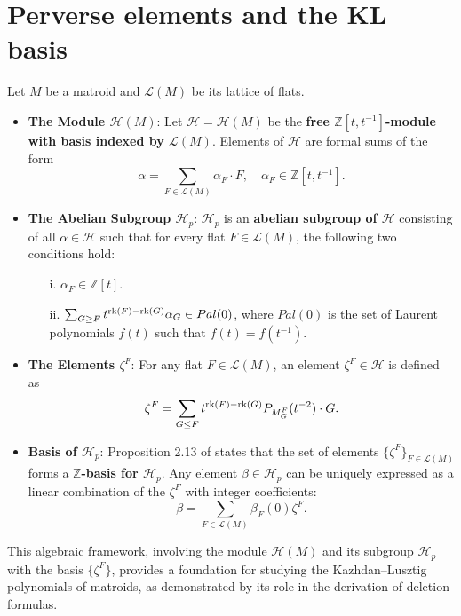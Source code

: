 \documentclass[10pt]{article}
\newcommand{\calL}{\mathcal{L}}
\newcommand{\calH}{\mathcal{H}}
\newcommand{\rank}{\normalfont\text{rk}}
\theoremstyle{remark}
\begin{document}
\section{Perverse elements and the KL basis}
\label{sec:algebraic_framework}

Let $M$ be a matroid and $\calL(M)$ be its lattice of flats.

\begin{itemize}
    \item \textbf{The Module $\calH(M)$}: Let $\calH = \calH(M)$ be the
    \textbf{free $\mathbb{Z}[t, t^{-1}]$-module with basis indexed by $\calL(M)$}.
    Elements of $\calH$ are formal sums of the form
    \[
    \alpha = \sum_{F \in \calL(M)} \alpha_F \cdot F, \quad \alpha_F \in \mathbb{Z}
    [t, t^{-1}].
    \]

    \item \textbf{The Abelian Subgroup $\calH_p$}: $\calH_p$ is an
    \textbf{abelian subgroup of $\calH$} consisting of all $\alpha \in \calH$
    such that for every flat $F \in \calL(M)$, the following two conditions hold:
    \begin{itemize}
        \item[i.] $\alpha_F \in \mathbb{Z}[t]$.
        \item[ii.] $\sum_{G \geq F} t^{\rank(F) - \rank(G)} \alpha_G \in Pal(0)$, where $Pal(0)$ is the set of Laurent polynomials $f(t)$ such that $f(t) = f(t^{-1})$.
    \end{itemize}

    \item \textbf{The Elements $\zeta^F$}: For any flat $F \in \calL(M)$, an element
    $\zeta^F \in \calH$ is defined as
    \[
    \zeta^F = \sum_{G \leq F} t^{\rank(F) - \rank(G)} P_{M_G^F}(t^{-2}) \cdot G.
    \]
    \item \textbf{Basis of $\calH_p$}: Proposition 2.13 of \cite{Bra19} states that the set of elements
    $\{\zeta^F\}_{F \in \calL(M)}$ forms a \textbf{$\mathbb{Z}$-basis for $\calH_p$}.
    Any element $\beta \in \calH_p$ can be uniquely expressed as a linear combination of
    the $\zeta^F$ with integer coefficients:
    \[
    \beta = \sum_{F \in \calL(M)} \beta_F(0) \zeta^F.
    \]
\end{itemize}

This algebraic framework, involving the module $\calH(M)$ and its subgroup $\calH_p$ with the basis $\{\zeta^F\}$, provides a foundation for studying the Kazhdan–Lusztig polynomials of matroids, as demonstrated by its role in the derivation of deletion formulas.
\end{document}
